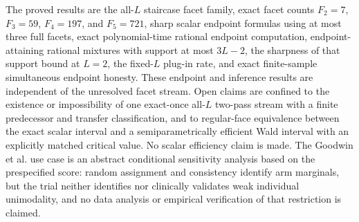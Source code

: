 \documentclass{article}
\begin{document}
The proved results are the all-\(L\) staircase facet family, exact facet counts \(F_2=7\), \(F_3=59\), \(F_4=197\), and \(F_5=721\), sharp scalar endpoint formulas using at most three full facets, exact polynomial-time rational endpoint computation, endpoint-attaining rational mixtures with support at most \(3L-2\), the sharpness of that support bound at \(L=2\), the fixed-\(L\) plug-in rate, and exact finite-sample simultaneous endpoint honesty.  These endpoint and inference results are independent of the unresolved facet stream.  Open claims are confined to the existence or impossibility of one exact-once all-\(L\) two-pass stream with a finite predecessor and transfer classification, and to regular-face equivalence between the exact scalar interval and a semiparametrically efficient Wald interval with an explicitly matched critical value.  No scalar efficiency claim is made.  The Goodwin et al. use case is an abstract conditional sensitivity analysis based on the prespecified score: random assignment and consistency identify arm marginals, but the trial neither identifies nor clinically validates weak individual unimodality, and no data analysis or empirical verification of that restriction is claimed.
\end{document}
